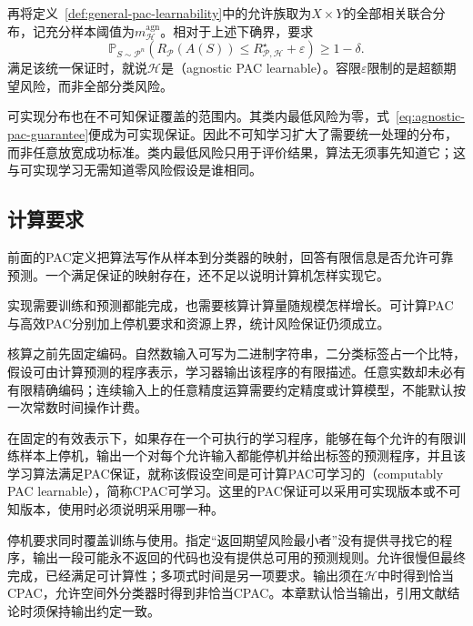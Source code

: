 再将定义~\ref{def:general-pac-learnability}中的允许族取为$X\times Y$的全部相关联合分布，记充分样本阈值为$m_{\mathcal H}^{\mathrm{agn}}$。相对于上述下确界，要求
\begin{equation}
 \mathbb P_{S\sim\mathcal P^n}\left(
 R_{\mathcal P}(A(S))\leq R_{\mathcal P,\mathcal H}^\star+\varepsilon
 \right)\geq1-\delta.
 \label{eq:agnostic-pac-guarantee}
\end{equation}
满足该统一保证时，就说$\mathcal H$是（agnostic PAC learnable）。容限$\varepsilon$限制的是超额期望风险，而非全部分类风险。

可实现分布也在不可知保证覆盖的范围内。其类内最低风险为零，式~\eqref{eq:agnostic-pac-guarantee}便成为可实现保证。因此不可知学习扩大了需要统一处理的分布，而非任意放宽成功标准。类内最低风险只用于评价结果，算法无须事先知道它；这与可实现学习无需知道零风险假设是谁相同。

\subsection{计算要求}
\label{sec:pac-computation-requirements}

前面的PAC定义把算法写作从样本到分类器的映射，回答有限信息是否允许可靠预测。一个满足保证的映射存在，还不足以说明计算机怎样实现它。

实现需要训练和预测都能完成，也需要核算计算量随规模怎样增长。可计算PAC与高效PAC分别加上停机要求和资源上界，统计风险保证仍须成立。

核算之前先固定编码。自然数输入可写为二进制字符串，二分类标签占一个比特，假设可由计算预测的程序表示，学习器输出该程序的有限描述。任意实数却未必有有限精确编码；连续输入上的任意精度运算需要约定精度或计算模型，不能默认按一次常数时间操作计费。

\begin{definition}[可计算PAC学习]
\label{def:computable-pac-learning}
在固定的有效表示下，如果存在一个可执行的学习程序，能够在每个允许的有限训练样本上停机，输出一个对每个允许输入都能停机并给出标签的预测程序，并且该学习算法满足PAC保证，就称该假设空间是可计算PAC可学习的（computably PAC learnable），简称CPAC可学习。这里的PAC保证可以采用可实现版本或不可知版本，使用时必须说明采用哪一种。
\end{definition}

停机要求同时覆盖训练与使用。指定“返回期望风险最小者”没有提供寻找它的程序，输出一段可能永不返回的代码也没有提供总可用的预测规则。允许很慢但最终完成，已经满足可计算性；多项式时间是另一项要求。输出须在$\mathcal H$中时得到恰当CPAC，允许空间外分类器时得到非恰当CPAC。本章默认恰当输出，引用文献结论时须保持输出约定一致。

